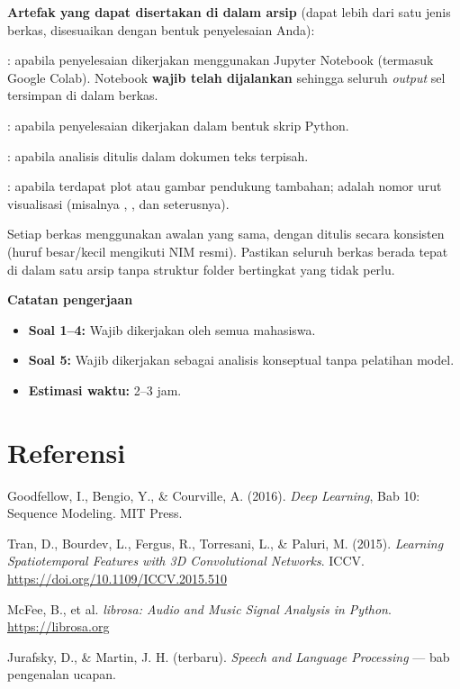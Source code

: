 \documentclass[12pt, a4paper]{article}
\begin{document}
\textbf{Artefak yang dapat disertakan di dalam arsip} (dapat lebih dari satu jenis berkas, disesuaikan dengan bentuk penyelesaian Anda):
\begin{borderedsquare}
  \item {}: apabila penyelesaian dikerjakan menggunakan Jupyter Notebook (termasuk Google Colab). Notebook \textbf{wajib telah dijalankan} sehingga seluruh \emph{output} sel tersimpan di dalam berkas.
  \item {}: apabila penyelesaian dikerjakan dalam bentuk skrip Python.
  \item {}: apabila analisis ditulis dalam dokumen teks terpisah.
  \item {}: apabila terdapat plot atau gambar pendukung tambahan;  adalah nomor urut visualisasi (misalnya , , dan seterusnya).
\end{borderedsquare}

Setiap berkas menggunakan awalan  yang sama, dengan  ditulis secara konsisten (huruf besar/kecil mengikuti NIM resmi). Pastikan seluruh berkas berada tepat di dalam satu arsip  tanpa struktur folder bertingkat yang tidak perlu.

\begin{callout}[ctpBlue]
\textbf{\color{ctpBlue}Catatan pengerjaan}
\begin{itemize}
  \item \textbf{Soal 1--4:} Wajib dikerjakan oleh semua mahasiswa.
  \item \textbf{Soal 5:} Wajib dikerjakan sebagai analisis konseptual tanpa pelatihan model.
  \item \textbf{Estimasi waktu:} 2--3 jam.
\end{itemize}
\end{callout}

\section*{Referensi}
{\small\color{ctpSubtext}
\begin{enumerate}[label={[\arabic*]}, leftmargin=2em]
  \item Goodfellow, I., Bengio, Y., \& Courville, A. (2016). \emph{Deep Learning}, Bab 10: Sequence Modeling. MIT Press.
  \item Tran, D., Bourdev, L., Fergus, R., Torresani, L., \& Paluri, M. (2015). \emph{Learning Spatiotemporal Features with 3D Convolutional Networks}. ICCV. \url{https://doi.org/10.1109/ICCV.2015.510}
  \item McFee, B., et al. \emph{librosa: Audio and Music Signal Analysis in Python}. \url{https://librosa.org}
  \item Jurafsky, D., \& Martin, J. H. (terbaru). \emph{Speech and Language Processing} --- bab pengenalan ucapan.
\end{enumerate}}
\end{document}
